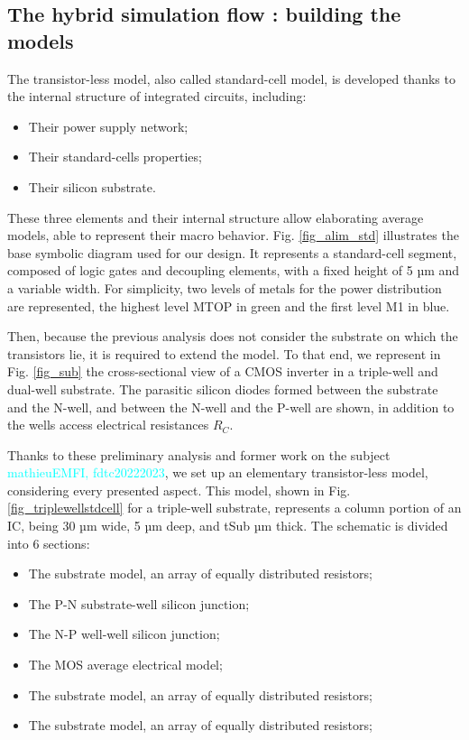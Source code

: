 \subsection{The hybrid simulation flow : building the models}
The transistor-less model, also called standard-cell model, is developed thanks to the internal structure of integrated circuits, including:
\begin{itemize}
	\item Their power supply network;
	\item Their standard-cells properties;
	\item Their silicon substrate.
\end{itemize}
These three elements and their internal structure allow elaborating average models, able to represent their macro behavior.
Fig. \ref{fig_alim_std} illustrates the base symbolic diagram used for our design.
It represents a standard-cell segment, composed of logic gates and decoupling elements, with a fixed height of 5 µm and a variable width.
For simplicity, two levels of metals for the power distribution are represented, the highest level MTOP in green and the first level M1 in blue.

Then, because the previous analysis does not consider the substrate on which the transistors lie, it is required to extend the model.
To that end, we represent in Fig. \ref{fig_sub} the cross-sectional view of a CMOS inverter in a triple-well and dual-well substrate.
The parasitic silicon diodes formed between the substrate and the N-well, and between the N-well and the P-well are shown, in addition to the wells access electrical resistances $R_C$.

Thanks to these preliminary analysis and former work on the subject \textcolor{cyan}{mathieuEMFI, fdtc20222023}, we set up an elementary transistor-less model, considering every presented aspect.
This model, shown in Fig. \ref{fig_triplewellstdcell} for a triple-well substrate, represents a column portion of an IC, being 30 µm wide, 5 µm deep, and tSub µm thick.
The schematic is divided into 6 sections:
\begin{itemize}
	\item {} The substrate model, an array of equally distributed resistors;
	\item {} The P-N substrate-well silicon junction;
	\item {} The N-P well-well silicon junction;
	\item {}  The MOS average electrical model;
	\item {}  The substrate model, an array of equally distributed resistors;
	\item {} The substrate model, an array of equally distributed resistors;
\end{itemize}






